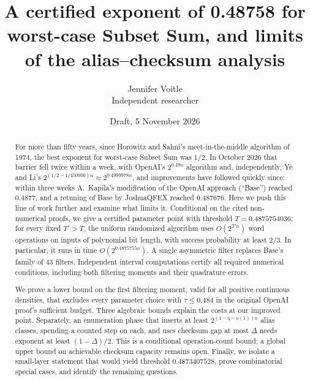 \documentclass[11pt]{article}
\theoremstyle{plain}
\begin{document}
\title{A certified exponent of 0.48758 for worst-case Subset Sum, and limits of the alias--checksum analysis}
\author{Jennifer Voitle\\ Independent researcher}
\date{Draft, 5 November 2026}

\maketitle

\begin{abstract}
For more than fifty years, since Horowitz and Sahni's meet-in-the-middle algorithm of 1974, the best exponent for worst-case Subset Sum was $1/2$. In October 2026 that barrier fell twice within a week, with OpenAI's $2^{0.49n}$ algorithm and, independently, Ye and Li's $2^{(1/2 - 1/450000)n} \approx 2^{0.4999978n}$, and improvements have followed quickly since: within three weeks A.~Kapila's modification of the OpenAI approach (``Base'') reached 0.4877, and a retuning of Base by JoshuaQFEX reached 0.487676. Here we push this line of work further and examine what limits it. Conditional on the cited non-numerical proofs, we give a certified parameter point with threshold $T=0.4875754036$: for every fixed $T'>T$, the uniform randomized algorithm uses $O(2^{T'n})$ word operations on inputs of polynomial bit length, with success probability at least $2/3$. In particular, it runs in time $O(2^{0.4875755n})$. A single asymmetric filter replaces Base's family of 43 filters. Independent interval computations certify all required numerical conditions, including both filtering moments and their quadrature errors.

We prove a lower bound on the first filtering moment, valid for all positive continuous densities, that excludes every parameter choice with $\tau\le0.484$ in the original OpenAI proof's sufficient budget. Three algebraic bounds explain the costs at our improved point. Separately, an enumeration phase that inserts at least $2^{(1-\eta-o(1))n}$ alias classes, spending a counted step on each, and uses checksum gap at most $\Delta$ needs exponent at least $(1-\Delta)/2$. This is a conditional operation-count bound; a global upper bound on achievable checksum capacity remains open. Finally, we isolate a small-layer statement that would yield threshold $0.4873407528$, prove combinatorial special cases, and identify the remaining questions.
\end{abstract}

\end{document}
